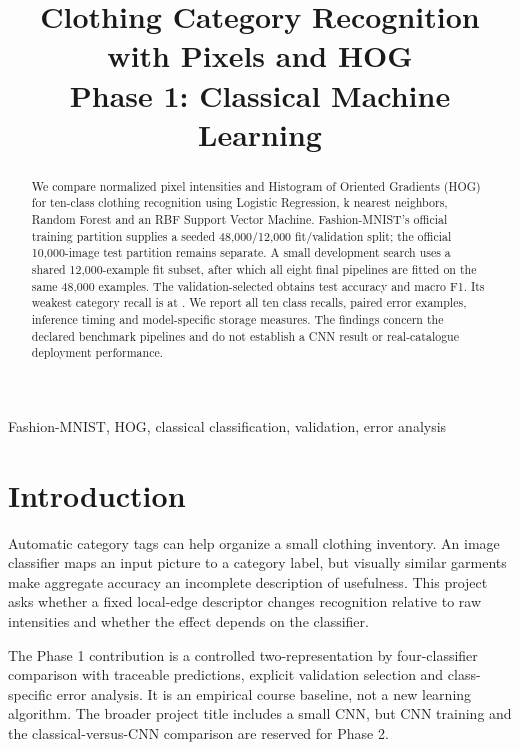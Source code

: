 \documentclass[conference]{IEEEtran}
\begin{document}
\title{Clothing Category Recognition with Pixels and HOG\\
\large Phase 1: Classical Machine Learning}
\ifdefined\IncludePrivateAuthors

\else
\author{
}
\fi
\maketitle

\begin{abstract}
We compare normalized pixel intensities and Histogram of Oriented Gradients
(HOG) for ten-class clothing recognition using Logistic Regression, k nearest
neighbors, Random Forest and an RBF Support Vector Machine. Fashion-MNIST's
official training partition supplies a seeded 48,000/12,000 fit/validation split;
the official 10,000-image test partition remains separate. A small development
search uses a shared 12,000-example fit subset, after which all eight final
pipelines are fitted on the same 48,000 examples. The validation-selected
\SelectedName{} obtains \SelectedAccuracy{} test accuracy and \SelectedFone{}
macro F1. Its weakest category recall is \WeakClass{} at \WeakRecall{}.
We report all ten class recalls, paired error examples, inference timing and
model-specific storage measures. The findings concern the declared benchmark
pipelines and do not establish a CNN result or real-catalogue deployment performance.
\end{abstract}

\begin{IEEEkeywords}
Fashion-MNIST, HOG, classical classification, validation, error analysis
\end{IEEEkeywords}

\section{Introduction}
Automatic category tags can help organize a small clothing inventory. An image
classifier maps an input picture to a category label, but visually similar
garments make aggregate accuracy an incomplete description of usefulness.
This project asks whether a fixed local-edge descriptor changes recognition
relative to raw intensities and whether the effect depends on the classifier.

The Phase 1 contribution is a controlled two-representation by four-classifier
comparison with traceable predictions, explicit validation selection and
class-specific error analysis. It is an empirical course baseline, not a new
learning algorithm. The broader project title includes a small CNN, but CNN
training and the classical-versus-CNN comparison are reserved for Phase 2.
\end{document}
